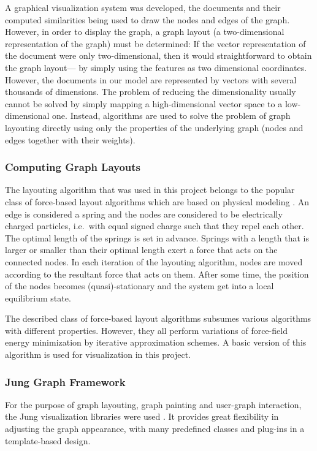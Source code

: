 A graphical visualization system was developed, the documents and their computed similarities being used to draw the nodes and edges of the graph.
However, in order to display the graph, a graph layout (a two-dimensional representation of the
graph) must be determined: If the vector representation of the document were only two-dimensional,
then it would straightforward to obtain the graph layout--- by simply using the features as two dimensional
coordinates. However, the documents in our model are represented by vectors with several thousands
of dimensions. The problem of reducing the dimensionality usually cannot be solved by simply mapping a high-dimensional vector space to a low-dimensional one. Instead, algorithms are used to solve the problem of graph layouting directly using only the properties of the underlying graph
(nodes and edges together with their weights).

\subsubsection{Computing Graph Layouts}
The layouting algorithm that was used in this project belongs to the popular class of force-based
layout algorithms which are based on physical modeling \cite{forcegraphs}. An edge is considered a spring and
the nodes are considered to be electrically charged particles, i.e.\ with equal signed charge such
that they repel each other. The optimal length of the springs is set in advance. Springs with a 
length that is larger or smaller than their optimal length exert a force that acts on the connected
nodes. In each iteration of the layouting algorithm, nodes are moved according to the resultant
force
that acts on them. After some time, the position of the nodes becomes (quasi)-stationary and the
system get into a local equilibrium state.

The described class of force-based layout algorithms subsumes various algorithms with different
properties. However, they all perform variations of force-field energy minimization by iterative
approximation schemes. A basic version of this algorithm is used for visualization in this project.

\subsubsection{Jung Graph Framework}
For the purpose of graph layouting, graph painting and user-graph interaction, the
Jung visualization libraries were used \cite{jung}. It provides great
flexibility in adjusting the graph appearance, with many predefined classes and plug-ins in a template-based design.

